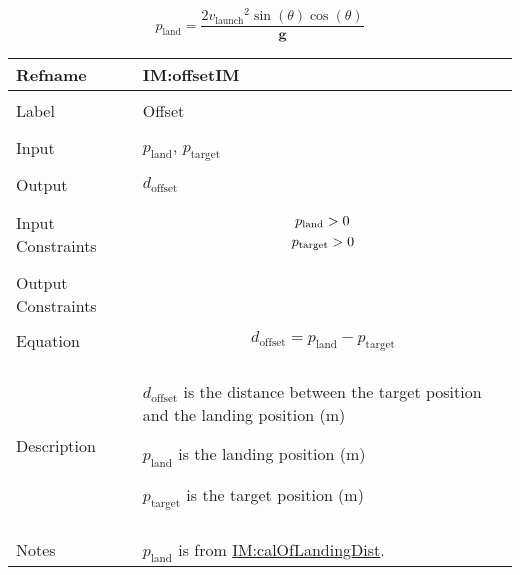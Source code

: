 \documentclass[12pt]{article}
\newcommand{\gt}{\ensuremath >}
\begin{document}
\begin{displaymath}
{p_{\text{land}}}=\frac{2 {v_{\text{launch}}}^{2} \sin\left(θ\right) \cos\left(θ\right)}{\mathbf{g}}
\end{displaymath}
\vspace{\baselineskip}
\noindent
\begin{minipage}{\textwidth}
\begin{tabular}{>{\raggedright}p{}>{\raggedright\arraybackslash}p{}}
\toprule \textbf{Refname} & \textbf{IM:offsetIM}
\label{IM:offsetIM}
\\ \midrule \\
Label & Offset
        
\\ \midrule \\
Input & ${p_{\text{land}}}$, ${p_{\text{target}}}$
        
\\ \midrule \\
Output & ${d_{\text{offset}}}$
         
\\ \midrule \\
Input Constraints & \begin{displaymath}
                    {p_{\text{land}}}\gt{}0
                    \end{displaymath}
                    \begin{displaymath}
                    {p_{\text{target}}}\gt{}0
                    \end{displaymath}
\\ \midrule \\
Output Constraints & 
\\ \midrule \\
Equation & \begin{displaymath}
           {d_{\text{offset}}}={p_{\text{land}}}-{p_{\text{target}}}
           \end{displaymath}
\\ \midrule \\
Description & \begin{symbDescription}
              \item{${d_{\text{offset}}}$ is the distance between the target position and the landing position (${\text{m}}$)}
              \item{${p_{\text{land}}}$ is the landing position (${\text{m}}$)}
              \item{${p_{\text{target}}}$ is the target position (${\text{m}}$)}
              \end{symbDescription}
\\ \midrule \\
Notes & ${p_{\text{land}}}$ is from \hyperref[IM:calOfLandingDist]{IM:calOfLandingDist}.
        

\end{tabular}
\end{minipage}
\end{document}
